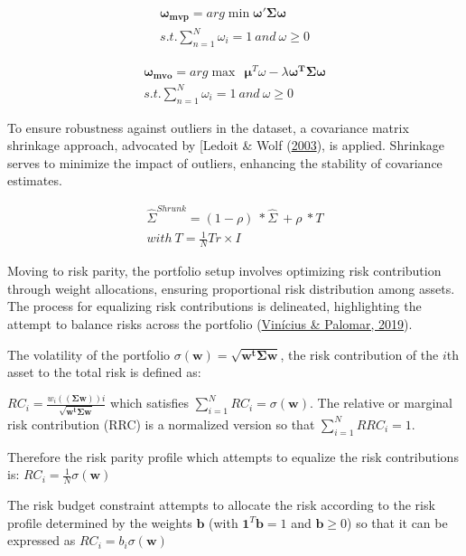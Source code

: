 \documentclass[12pt,preprint, authoryear]{elsarticle}
\numberwithin{equation}{section}
\numberwithin{figure}{section}
\numberwithin{table}{section}
\begin{document}
\begin{align}
 \boldsymbol{\omega_{mvp}}= arg \min \boldsymbol{\omega' \Sigma\omega} \\
  s.t. \sum_{n=1}^{N} \omega_i = 1 \ and\ \omega \ge 0
\end{align}

\begin{align}
 \boldsymbol{\omega_{mvo}}= arg\max\ \ \boldsymbol{\mu}^T\omega-\lambda\boldsymbol{\omega^T\Sigma\omega} \\
  s.t. \sum_{n=1}^{N} \omega_i = 1 \ and\ \omega \ge 0
\end{align}

To ensure robustness against outliers in the dataset, a covariance
matrix shrinkage approach, advocated by {[}Ledoit \& Wolf
(\protect\hyperlink{ref-ledoit2003improved}{2003}), is applied.
Shrinkage serves to minimize the impact of outliers, enhancing the
stability of covariance estimates.

\begin{align}
\hat{\Sigma}^{Shrunk}=(1-\rho)\ *  \hat{\Sigma} \ + \rho \ * T\\
with \ T= \frac{1}{N}Tr \times I
\end{align}

Moving to risk parity, the portfolio setup involves optimizing risk
contribution through weight allocations, ensuring proportional risk
distribution among assets. The process for equalizing risk contributions
is delineated, highlighting the attempt to balance risks across the
portfolio (\protect\hyperlink{ref-RPP}{Vinícius \& Palomar, 2019}).

The volatility of the portfolio
\(\sigma(\boldsymbol{w})=\sqrt{\boldsymbol{w^t\Sigma w}}\), the risk
contribution of the \(i\)th asset to the total risk is defined as:

\(RC_i=\frac{w_i((\boldsymbol{\Sigma w}))i}{\sqrt{\boldsymbol{w^t\Sigma w}}}\)
which satisfies \(\sum_{i=1}^{N} RC_i = \sigma(\boldsymbol{w})\). The
relative or marginal risk contribution (RRC) is a normalized version so
that \(\sum_{i=1}^{N} RRC_i = 1\).

Therefore the risk parity profile which attempts to equalize the risk
contributions is: \(RC_i=\frac{1}{N}\sigma (\boldsymbol{w})\)

The risk budget constraint attempts to allocate the risk according to
the risk profile determined by the weights \(\boldsymbol{b}\) (with
\(\boldsymbol{1}^T \boldsymbol{b} =1\) and \(\boldsymbol{b} \ge 0\)) so
that it can be expressed as \(RC_i=b_i\sigma (\boldsymbol{w})\)
\end{document}
